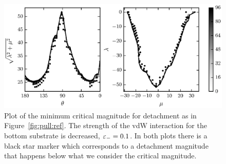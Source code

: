    \begin{figure}[t]
      \begin{center}
         \includegraphics{./fig/ch3/pull/eb0.1/grid.eps}
      \end{center}      
      \caption{Plot of the minimum critical magnitude for detachment as in Figure~\ref{fig:pull:ref}. The strength of the vdW interaction for the bottom substrate is decreased, $\varepsilon_-=0.1$. In both plots there is a black star marker which corresponds to a detachment magnitude that happens below what we consider the critical magnitude.
      \label{fig:pull:eb0.1}}
   \end{figure}

